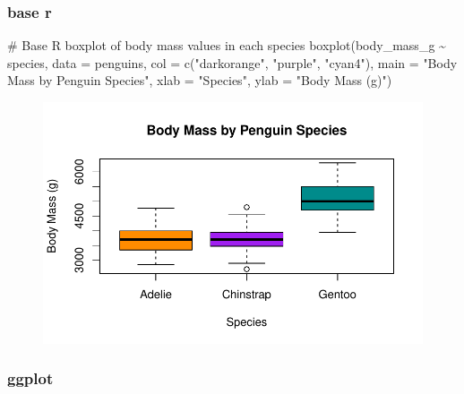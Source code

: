\documentclass[
  letterpaper,
  DIV=11,
  numbers=noendperiod]{scrreprt}
\newenvironment{Shaded}{\begin{snugshade}}{\end{snugshade}}
\newcommand{\AttributeTok}[1]{\textcolor[rgb]{0.40,0.45,0.13}{#1}}
\newcommand{\CommentTok}[1]{\textcolor[rgb]{0.37,0.37,0.37}{#1}}
\newcommand{\FunctionTok}[1]{\textcolor[rgb]{0.28,0.35,0.67}{#1}}
\newcommand{\NormalTok}[1]{\textcolor[rgb]{0.00,0.23,0.31}{#1}}
\newcommand{\SpecialCharTok}[1]{\textcolor[rgb]{0.37,0.37,0.37}{#1}}
\newcommand{\StringTok}[1]{\textcolor[rgb]{0.13,0.47,0.30}{#1}}
\begin{document}
\begin{tcolorbox}
\begin{figure}[H]
{}

\end{figure}

\hypertarget{base-r-5}{%
\subsubsection{base r}\label{base-r-5}}

\begin{Shaded}
\begin{Highlighting}[]
\CommentTok{\# Base R boxplot of body mass values in each species}
\FunctionTok{boxplot}\NormalTok{(body\_mass\_g }\SpecialCharTok{\textasciitilde{}}\NormalTok{ species, }\AttributeTok{data =}\NormalTok{ penguins,}
        \AttributeTok{col =} \FunctionTok{c}\NormalTok{(}\StringTok{"darkorange"}\NormalTok{, }\StringTok{"purple"}\NormalTok{, }\StringTok{"cyan4"}\NormalTok{),}
        \AttributeTok{main =} \StringTok{"Body Mass by Penguin Species"}\NormalTok{,}
        \AttributeTok{xlab =} \StringTok{"Species"}\NormalTok{,}
        \AttributeTok{ylab =} \StringTok{"Body Mass (g)"}\NormalTok{)}
\end{Highlighting}
\end{Shaded}

\begin{figure}[H]

{\centering \includegraphics{scripts/02_dataViz/class4_files/figure-pdf/boxplot-1.pdf}

}

\end{figure}

\end{tcolorbox}

\hypertarget{ggplot-6}{%
\subsubsection{ggplot}\label{ggplot-6}}
\end{document}
